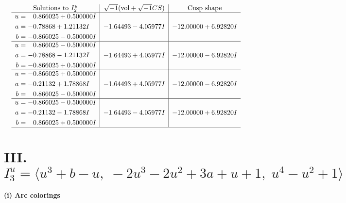 \documentclass[1p]{elsarticle_modified}
\theoremstyle{definition}
\newcommand{\I}{\sqrt{-1}}
\begin{document}
$$\begin{array}{c|c|c}  
\text{Solutions to }I^u_{2}& \I (\text{vol} + \sqrt{-1}CS) & \text{Cusp shape}\\
 \hline 
\begin{aligned}
u &= \phantom{-}0.866025 + 0.500000 I \\
a &= -0.78868 + 1.21132 I \\
b &= -0.866025 - 0.500000 I\end{aligned}
 & -1.64493 - 4.05977 I & -12.00000 + 6.92820 I \\ \hline\begin{aligned}
u &= \phantom{-}0.866025 - 0.500000 I \\
a &= -0.78868 - 1.21132 I \\
b &= -0.866025 + 0.500000 I\end{aligned}
 & -1.64493 + 4.05977 I & -12.00000 - 6.92820 I \\ \hline\begin{aligned}
u &= -0.866025 + 0.500000 I \\
a &= -0.21132 + 1.78868 I \\
b &= \phantom{-}0.866025 - 0.500000 I\end{aligned}
 & -1.64493 + 4.05977 I & -12.00000 - 6.92820 I \\ \hline\begin{aligned}
u &= -0.866025 - 0.500000 I \\
a &= -0.21132 - 1.78868 I \\
b &= \phantom{-}0.866025 + 0.500000 I\end{aligned}
 & -1.64493 - 4.05977 I & -12.00000 + 6.92820 I\\
 \hline 
 \end{array}$$\newpage\newpage\renewcommand{\arraystretch}{1}
\centering \section*{III. $I^u_{3}= \langle u^3+b- u,\;-2 u^3-2 u^2+3 a+u+1,\;u^4- u^2+1 \rangle$}
\flushleft \textbf{(i) Arc colorings}\\
\end{document}

